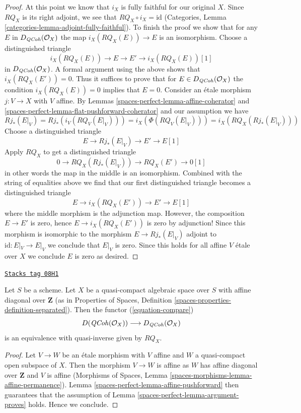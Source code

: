 \begin{proof}
\medskip\noindent
At this point we know that $i_X$ is fully faithful for our original $X$.
Since $RQ_X$ is its right adjoint, we see that
$RQ_X \circ i_X = \text{id}$ (Categories, Lemma
\ref{categories-lemma-adjoint-fully-faithful}).
To finish the proof we show that for any
$E$ in $D_{\mathit{QCoh}}(\mathcal{O}_X)$ the map
$i_X(RQ_X(E)) \to E$ is an isomorphism. Choose a distinguished triangle
$$
i_X(RQ_X(E)) \to E \to E' \to i_X(RQ_X(E))[1]
$$
in $D_{\mathit{QCoh}}(\mathcal{O}_X)$. A formal argument using the
above shows that $i_X(RQ_X(E')) = 0$. Thus it suffices to prove that
for $E \in D_{\mathit{QCoh}}(\mathcal{O}_X)$ the condition
$i_X(RQ_X(E)) = 0$ implies that $E = 0$. Consider an \'etale morphism
$j : V \to X$ with $V$ affine. By
Lemmas \ref{spaces-perfect-lemma-affine-coherator} and
\ref{spaces-perfect-lemma-flat-pushforward-coherator}
and our assumption we have
$$
Rj_*(E|_V) = Rj_*(i_V(RQ_V(E|_V))) = i_X(\Phi(RQ_V(E|_V))) =
i_X(RQ_X(Rj_*(E|_V)))
$$
Choose a distinguished triangle
$$
E \to Rj_*(E|_V) \to E' \to E[1]
$$
Apply $RQ_X$ to get a distinguished triangle
$$
0 \to RQ_X(Rj_*(E|_V)) \to RQ_X(E') \to 0[1]
$$
in other words the map in the middle is an isomorphism.
Combined with the string of equalities above we find
that our first distinguished triangle becomes a distinguished triangle
$$
E \to i_X(RQ_X(E')) \to E' \to E[1]
$$
where the middle morphism is the adjunction map. However, the composition
$E \to E'$ is zero, hence $E \to i_X(RQ_X(E'))$ is zero by adjunction!
Since this morphism is isomorphic to the morphism
$E \to Rj_*(E|_V)$ adjoint to $\text{id} : E|_V \to E|_V$ we
conclude that $E|_V$ is zero. Since this holds for all
affine $V$ \'etale over $X$ we conclude $E$ is zero as desired.
\end{proof}

\begin{proposition}
\label{spaces-perfect-proposition-quasi-compact-affine-diagonal}
\href{https://stacks.math.columbia.edu/tag/08H1}{\texttt{Stacks tag 08H1}}

Let $S$ be a scheme. Let $X$ be a quasi-compact algebraic space over $S$
with affine diagonal over $\mathbf{Z}$ (as in Properties of Spaces, Definition
\ref{spaces-properties-definition-separated}). Then the functor
(\ref{equation-compare})
$$
D(\mathit{QCoh}(\mathcal{O}_X))
\longrightarrow
D_{\mathit{QCoh}}(\mathcal{O}_X)
$$
is an equivalence with quasi-inverse given by $RQ_X$.
\end{proposition}

\begin{proof}
Let $V \to W$ be an \'etale morphism with $V$ affine and $W$ a
quasi-compact open subspace of $X$. Then
the morphism $V \to W$ is affine as $W$ has affine diagonal over $\mathbf{Z}$
and $V$ is affine
(Morphisms of Spaces, Lemma \ref{spaces-morphisms-lemma-affine-permanence}).
Lemma \ref{spaces-perfect-lemma-affine-pushforward} then guarantees that
the assumption of Lemma \ref{spaces-perfect-lemma-argument-proves} holds.
Hence we conclude.
\end{proof}

